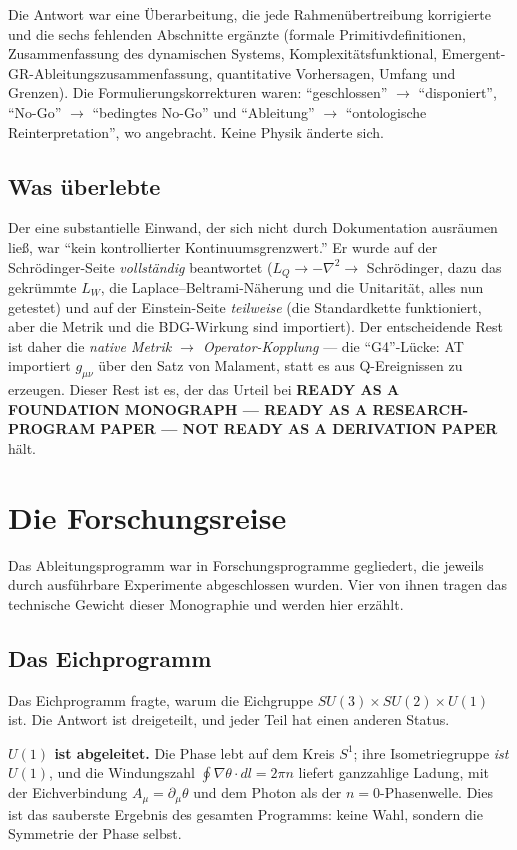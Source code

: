 \documentclass[10pt,twoside,openany]{book}
\begin{document}
Die Antwort war eine Überarbeitung, die jede Rahmenübertreibung korrigierte und die sechs
fehlenden Abschnitte ergänzte (formale Primitivdefinitionen, Zusammenfassung des
dynamischen Systems, Komplexitätsfunktional, Emergent-GR-Ableitungszusammenfassung,
quantitative Vorhersagen, Umfang und Grenzen). Die Formulierungskorrekturen waren:
``geschlossen'' $\to$ ``disponiert'', ``No-Go'' $\to$ ``bedingtes No-Go'' und
``Ableitung'' $\to$ ``ontologische Reinterpretation'', wo angebracht. Keine Physik änderte
sich.

\section{Was überlebte}

Der eine substantielle Einwand, der sich nicht durch Dokumentation ausräumen ließ, war
``kein kontrollierter Kontinuumsgrenzwert.'' Er wurde auf der Schr\"odinger-Seite
\emph{vollständig} beantwortet ($L_Q\to-\nabla^2\to$ Schr\"odinger, dazu das gekrümmte
$L_W$, die Laplace--Beltrami-Näherung und die Unitarität, alles nun getestet) und auf der
Einstein-Seite \emph{teilweise} (die Standardkette funktioniert, aber die Metrik und die
BDG-Wirkung sind importiert). Der entscheidende Rest ist daher die \emph{native Metrik
$\to$ Operator-Kopplung} --- die ``G4''-Lücke: AT importiert $g_{\mu\nu}$ über den Satz
von Malament, statt es aus Q-Ereignissen zu erzeugen. Dieser Rest ist es, der das Urteil
bei \textbf{READY AS A FOUNDATION MONOGRAPH --- READY AS A RESEARCH-PROGRAM PAPER --- NOT
READY AS A DERIVATION PAPER} hält.

\chapter{Die Forschungsreise}
\label{ch:journey}

Das Ableitungsprogramm war in Forschungsprogramme gegliedert, die jeweils durch
ausführbare Experimente abgeschlossen wurden. Vier von ihnen tragen das technische
Gewicht dieser Monographie und werden hier erzählt.

\section{Das Eichprogramm}

Das Eichprogramm fragte, warum die Eichgruppe $SU(3)\times SU(2)\times U(1)$ ist. Die
Antwort ist dreigeteilt, und jeder Teil hat einen anderen Status.

\textbf{$U(1)$ ist abgeleitet.} Die Phase lebt auf dem Kreis $S^1$; ihre
Isometriegruppe \emph{ist} $U(1)$, und die Windungszahl
$\oint\nabla\theta\cdot dl=2\pi n$ liefert ganzzahlige Ladung, mit der Eichverbindung
$A_\mu=\partial_\mu\theta$ und dem Photon als der $n=0$-Phasenwelle. Dies ist das
sauberste Ergebnis des gesamten Programms: keine Wahl, sondern die Symmetrie der Phase
selbst.
\end{document}
